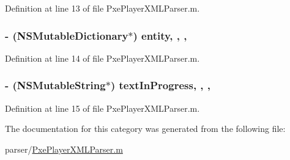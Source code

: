 Definition at line 13 of file Pxe\-Player\-X\-M\-L\-Parser.\-m.

\hypertarget{category_pxe_player_x_m_l_parser_07_08_abf485c61ffa04ef93bc172c965b45553}{
\subsubsection[{entity}]{\setlength{\rightskip}{0pt plus 5cm}-\/ (N\-S\-Mutable\-Dictionary$\ast$) entity\hspace{0.3cm}{\ttfamily [read]}, {\ttfamily [write]}, {\ttfamily [nonatomic]}, {\ttfamily [strong]}}}\label{category_pxe_player_x_m_l_parser_07_08_abf485c61ffa04ef93bc172c965b45553}


Definition at line 14 of file Pxe\-Player\-X\-M\-L\-Parser.\-m.

\hypertarget{category_pxe_player_x_m_l_parser_07_08_a8b6c70906722a1b5a4cb50d148ef22d2}{
\subsubsection[{text\-In\-Progress}]{\setlength{\rightskip}{0pt plus 5cm}-\/ (N\-S\-Mutable\-String$\ast$) text\-In\-Progress\hspace{0.3cm}{\ttfamily [read]}, {\ttfamily [write]}, {\ttfamily [nonatomic]}, {\ttfamily [strong]}}}\label{category_pxe_player_x_m_l_parser_07_08_a8b6c70906722a1b5a4cb50d148ef22d2}


Definition at line 15 of file Pxe\-Player\-X\-M\-L\-Parser.\-m.



The documentation for this category was generated from the following file\-:\begin{DoxyCompactItemize}
\item 
parser/\hyperlink{_pxe_player_x_m_l_parser_8m}{Pxe\-Player\-X\-M\-L\-Parser.\-m}\end{DoxyCompactItemize}
